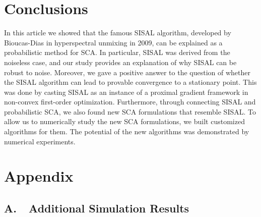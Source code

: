 \documentclass[10pt,twocolumn,twoside]{IEEEtran}
\begin{document}
\section{Conclusions}
\label{sec:conclusions}

In this article we showed that the famous SISAL algorithm, developed by Bioucas-Dias in hyperspectral unmixing in 2009, can be explained as a probabilistic method for SCA.
In particular, SISAL was derived from the noiseless case, and our study provides an explanation of why SISAL can be robust to noise.
Moreover, we gave a positive answer to the question of whether the SISAL algorithm can lead to provable convergence to a stationary point.
This was done by casting SISAL as an instance of a proximal gradient framework in non-convex first-order optimization.
Furthermore, through connecting SISAL and probabilistic SCA, we also found new SCA formulations that resemble SISAL.
To allow us to numerically study the new SCA formulations, we built customized algorithms for them.
The potential of the new algorithms was demonstrated by numerical experiments.






\clearpage
\appendix
\section*{Appendix}
\subsection*{A.~~Additional Simulation Results}
\label{sect:add_sim}
\end{document}

